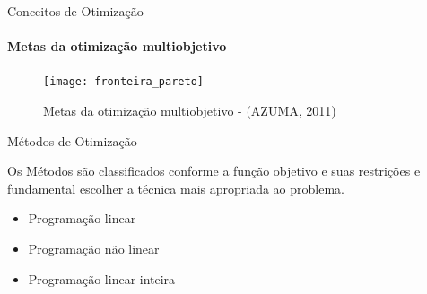\documentclass[]{beamer}
\begin{document}
\begin{frame}{Conceitos de Otimização}
	\framesubtitle{Metas da otimização multiobjetivo}
	
	\begin{figure}[!htb]	
		\begin{center}
			\texttt{[image: fronteira\_pareto]}
		\end{center}
		\caption{Metas da otimização multiobjetivo - (AZUMA, 2011)}
		\label{figura:fronteira_pareto}
	\end{figure}	

\end{frame}



\begin{frame}{Métodos de Otimização}
	
	Os Métodos são classificados conforme a função objetivo e suas restrições e fundamental
	escolher a técnica mais apropriada ao problema.	
	
	\begin{itemize}
		\item Programação linear
		\item Programação não linear
		\item Programação linear inteira
	\end{itemize}	
\end{frame}
\end{document}
